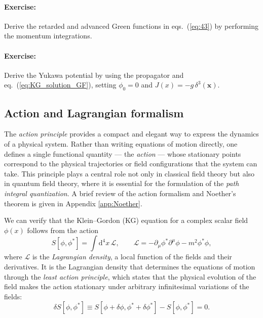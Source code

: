 \paragraph{Exercise:} Derive the retarded and advanced Green functions in eqs.~(\eqref{eq:43}) by
performing the momentum integrations.

\paragraph{Exercise:} Derive the Yukawa potential by using the propagator and
eq.~(\eqref{eq:KG_solution_GF}), setting $\phi_0 = 0$ and $J(x) = -g \, \delta^3(\mathbf{x})$.

\subsection{Action and Lagrangian formalism}

The \textit{action principle} provides a compact and elegant way to express the dynamics of a physical system.
Rather than writing equations of motion directly, one defines a single functional quantity — the \textit{action} — whose stationary points correspond to the physical trajectories or field configurations that the system can take.
This principle plays a central role not only in classical field theory but also in quantum field theory, where it is essential for the formulation of the \textit{path integral quantization}.
A brief review of the action formalism and Noether’s theorem is given in Appendix \ref{app:Noether}.

We can verify that the Klein--Gordon (KG) equation for a complex scalar field $\phi(x)$ follows from the action
\begin{equation}
    S[\phi, \phi^{\ast}] = \int \mathrm{d}^4 x \, \mathcal{L},
    \qquad
    \mathcal{L} = - \partial_{\mu} \phi^{\ast} \partial^{\mu} \phi - m^2 \phi^{\ast} \phi,
    \label{eq:KG_action_lagrangian}
\end{equation}
where $\mathcal{L}$ is the \textit{Lagrangian density}, a local function of the fields and their derivatives.
It is the Lagrangian density that determines the equations of motion through the \textit{least action principle}, which states that the physical evolution of the field makes the action stationary under arbitrary infinitesimal variations of the fields:
\begin{equation}
    \delta S[\phi, \phi^{\ast}] \equiv S[\phi + \delta \phi, \phi^{\ast} + \delta \phi^{\ast}] - S[\phi, \phi^{\ast}] = 0.
    \label{eq:least_action_principle}
\end{equation}

